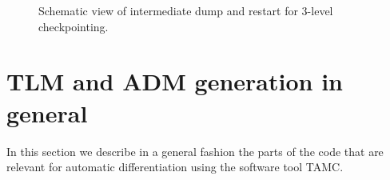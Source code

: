 \begin{figure}[t!]
\begin{center}
\end{center}
\caption{
Schematic view of intermediate dump and restart for 
3-level checkpointing.}
\label{fig:3levelcheck}
\end{figure}




\newpage 

\section{TLM and ADM generation in general}
\label{sec_ad_setup_gen}

In this section we describe in a general fashion 
the parts of the code that are relevant for automatic
differentiation using the software tool TAMC. 



